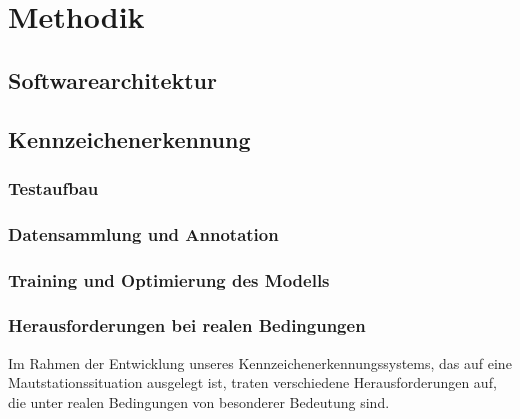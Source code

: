 \section{Methodik}
\subsection{Softwarearchitektur}
\subsection{Kennzeichenerkennung}
\subsubsection{Testaufbau}
\subsubsection{Datensammlung und Annotation}
\subsubsection{Training und Optimierung des Modells}
\subsubsection{Herausforderungen bei realen Bedingungen}
Im Rahmen der Entwicklung unseres Kennzeichenerkennungssystems, das auf eine Mautstationssituation ausgelegt ist, traten verschiedene Herausforderungen auf, die unter realen Bedingungen von besonderer Bedeutung sind. \singlespacing

